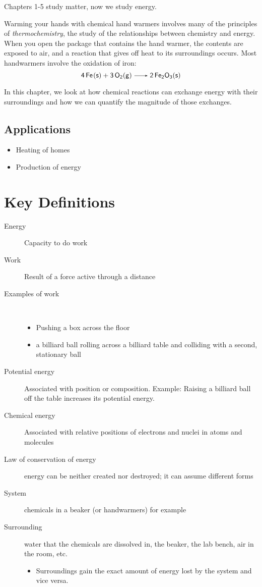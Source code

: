 \documentclass[
	chapter=6,
	title={Thermochemistry},
	showanswers=true,
]{chem122notes}
\begin{document}
Chapters 1-5 study matter, now we study energy.

Warming your hands with chemical hand warmers involves many of the principles of \emph{thermochemistry}, the study of the relationships between chemistry and energy.
When you open the package that contains the hand warmer, the contents are exposed to air, and a reaction that gives off heat to its surroundings occurs.
Most handwarmers\label{dfn:chemical-handwarmers} involve the oxidation of iron:
\[ \ce{4Fe(s) + 3O2(g) -> 2Fe2O3(s)} \]

In this chapter, we look at how chemical reactions can exchange energy with their surroundings and how we can quantify the magnitude of those exchanges.

\subsection{Applications}\label{subsec:applications}
\begin{itemize}
	\item Heating of homes
	\item Production of energy
\end{itemize}

\section{Key Definitions}\label{sec:key-definitions}
\begin{description}
	\item[Energy] Capacity to do work
	\item[Work] Result of a force active through a distance
	\item[Examples of work]~
	\begin{itemize}
		\item Pushing a box across the floor
		\item a billiard ball rolling across a billiard table and colliding with a second, stationary ball
	\end{itemize}
	\item[Potential energy] Associated with position or composition. Example: Raising a billiard ball off the table increases its potential energy.
	\item[Chemical energy] Associated with relative positions of electrons and nuclei in atoms and molecules
	\item[Law of conservation of energy] energy can be neither created nor destroyed; it can assume different forms
	\item[System] chemicals in a beaker (or handwarmers) for example
	\item[Surrounding] water that the chemicals are dissolved in, the beaker, the lab bench, air in the room, etc.
	\begin{itemize}
		\item Surroundings gain the exact amount of energy lost by the system and vice versa.
	\end{itemize}
\end{description}
\end{document}
